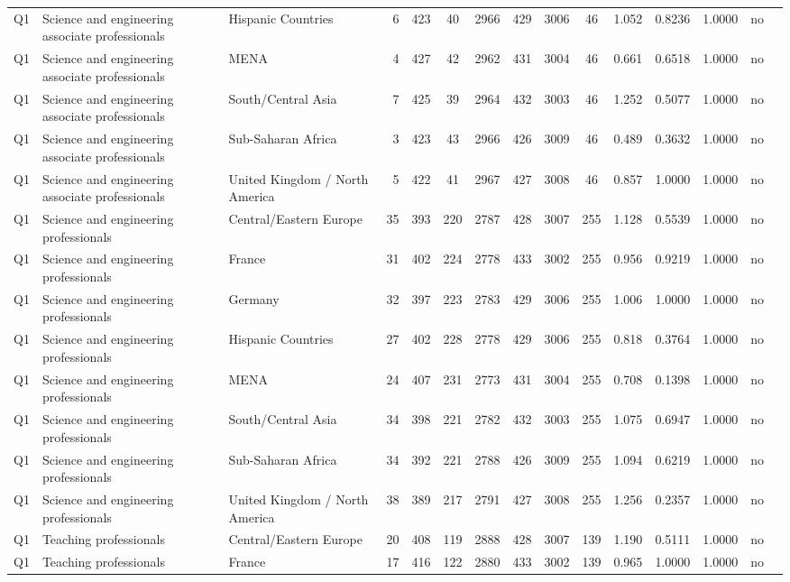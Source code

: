 \begin{longtable}{lllrcccccccccll}
Q1 & Science and engineering associate professionals & Hispanic Countries & 6 & 423 & 40 & 2966 & 429 & 3006 & 46 & 1.052 & 0.8236 & 1.0000 & no \\
Q1 & Science and engineering associate professionals & MENA & 4 & 427 & 42 & 2962 & 431 & 3004 & 46 & 0.661 & 0.6518 & 1.0000 & no \\
Q1 & Science and engineering associate professionals & South/Central Asia & 7 & 425 & 39 & 2964 & 432 & 3003 & 46 & 1.252 & 0.5077 & 1.0000 & no \\
Q1 & Science and engineering associate professionals & Sub-Saharan Africa & 3 & 423 & 43 & 2966 & 426 & 3009 & 46 & 0.489 & 0.3632 & 1.0000 & no \\
Q1 & Science and engineering associate professionals & United Kingdom / North America & 5 & 422 & 41 & 2967 & 427 & 3008 & 46 & 0.857 & 1.0000 & 1.0000 & no \\
Q1 & Science and engineering professionals & Central/Eastern Europe & 35 & 393 & 220 & 2787 & 428 & 3007 & 255 & 1.128 & 0.5539 & 1.0000 & no \\
Q1 & Science and engineering professionals & France & 31 & 402 & 224 & 2778 & 433 & 3002 & 255 & 0.956 & 0.9219 & 1.0000 & no \\
Q1 & Science and engineering professionals & Germany & 32 & 397 & 223 & 2783 & 429 & 3006 & 255 & 1.006 & 1.0000 & 1.0000 & no \\
Q1 & Science and engineering professionals & Hispanic Countries & 27 & 402 & 228 & 2778 & 429 & 3006 & 255 & 0.818 & 0.3764 & 1.0000 & no \\
Q1 & Science and engineering professionals & MENA & 24 & 407 & 231 & 2773 & 431 & 3004 & 255 & 0.708 & 0.1398 & 1.0000 & no \\
Q1 & Science and engineering professionals & South/Central Asia & 34 & 398 & 221 & 2782 & 432 & 3003 & 255 & 1.075 & 0.6947 & 1.0000 & no \\
Q1 & Science and engineering professionals & Sub-Saharan Africa & 34 & 392 & 221 & 2788 & 426 & 3009 & 255 & 1.094 & 0.6219 & 1.0000 & no \\
Q1 & Science and engineering professionals & United Kingdom / North America & 38 & 389 & 217 & 2791 & 427 & 3008 & 255 & 1.256 & 0.2357 & 1.0000 & no \\
Q1 & Teaching professionals & Central/Eastern Europe & 20 & 408 & 119 & 2888 & 428 & 3007 & 139 & 1.190 & 0.5111 & 1.0000 & no \\
Q1 & Teaching professionals & France & 17 & 416 & 122 & 2880 & 433 & 3002 & 139 & 0.965 & 1.0000 & 1.0000 & no \\

\end{longtable}
